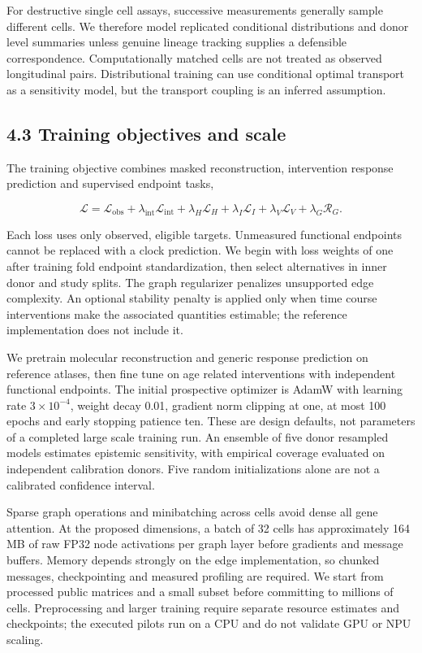 \documentclass[
  11pt,
  letterpaper,
]{article}
\begin{document}
For destructive single cell assays, successive measurements generally
sample different cells. We therefore model replicated conditional
distributions and donor level summaries unless genuine lineage tracking
supplies a defensible correspondence. Computationally matched cells are
not treated as observed longitudinal pairs. Distributional training can
use conditional optimal transport as a sensitivity model, but the
transport coupling is an inferred assumption.

\hypertarget{training-objectives-and-scale}{%
\subsection{4.3 Training objectives and
scale}\label{training-objectives-and-scale}}

The training objective combines masked reconstruction, intervention
response prediction and supervised endpoint tasks,

\[
\mathcal L=\mathcal L_{\mathrm{obs}}+\lambda_{\mathrm{int}}\mathcal L_{\mathrm{int}}
+\lambda_H\mathcal L_H+\lambda_I\mathcal L_I+
\lambda_V\mathcal L_V+\lambda_G\mathcal R_G.
\]

Each loss uses only observed, eligible targets. Unmeasured functional
endpoints cannot be replaced with a clock prediction. We begin with loss
weights of one after training fold endpoint standardization, then select
alternatives in inner donor and study splits. The graph regularizer
penalizes unsupported edge complexity. An optional stability penalty is
applied only when time course interventions make the associated
quantities estimable; the reference implementation does not include it.

We pretrain molecular reconstruction and generic response prediction on
reference atlases, then fine tune on age related interventions with
independent functional endpoints. The initial prospective optimizer is
AdamW with learning rate \(3\times10^{-4}\), weight decay 0.01, gradient
norm clipping at one, at most 100 epochs and early stopping patience
ten. These are design defaults, not parameters of a completed large
scale training run. An ensemble of five donor resampled models estimates
epistemic sensitivity, with empirical coverage evaluated on independent
calibration donors. Five random initializations alone are not a
calibrated confidence interval.

Sparse graph operations and minibatching across cells avoid dense all
gene attention. At the proposed dimensions, a batch of 32 cells has
approximately 164 MB of raw FP32 node activations per graph layer before
gradients and message buffers. Memory depends strongly on the edge
implementation, so chunked messages, checkpointing and measured
profiling are required. We start from processed public matrices and a
small subset before committing to millions of cells. Preprocessing and
larger training require separate resource estimates and checkpoints; the
executed pilots run on a CPU and do not validate GPU or NPU scaling.
\end{document}
